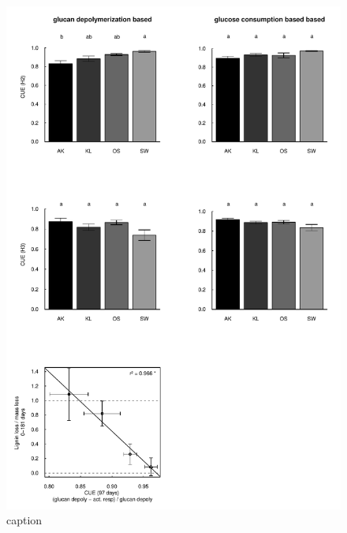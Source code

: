 \documentclass[authoryear,preprint,review,12pt]{elsarticle}
\begin{document}
\newpage
\begin{figure}[h!]
\vspace*{2mm}
\begin{center}
\includegraphics{sbb-CUE}
\end{center}
\caption{caption}
\label{fig:cutlig}
\end{figure}     
     
\end{document}
